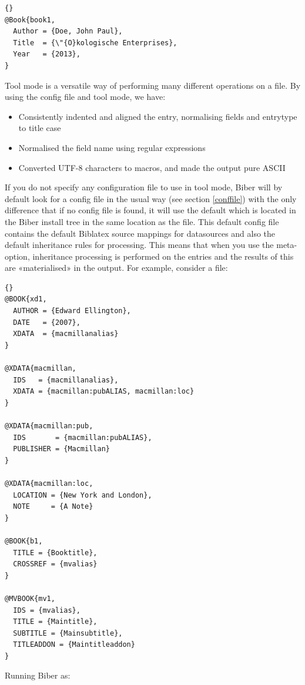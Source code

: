 \documentclass{ltxdockit}
\newcommand*{\biber}{Biber\xspace}
\newcommand*{\biblatex}{Biblatex\xspace}
\begin{document}
\begin{lstlisting}[style=bibtex, columns=fixed]{}
@Book{book1,
  Author = {Doe, John Paul},
  Title  = {\"{O}kologische Enterprises},
  Year   = {2013},
}
\end{lstlisting}
%
Tool mode is a versatile way of performing many different operations
on a  file. By using the config file and tool mode, we
have:

\begin{itemize}
\item Consistently indented and aligned the entry, normalising fields and
  entrytype to title case
\item Normalised the  field name using regular expressions
\item Converted UTF-8 characters to \latex macros, and made the output
  pure ASCII
\end{itemize}

If you do not specify any configuration file to use in tool mode, \biber
will by default look for a config file in the usual way (see section
\ref{conffile}) with the only difference that if no config file is found,
it will use the default  which is located in the
\biber install tree in the same location as the  file. This
default config file contains the default \biblatex source mappings for
\bibtex datasources and also the default inheritance rules for
 processing. This means that when you use the
 meta-option, inheritance processing is performed on the
entries and the results of this are «materialised» in the output. For
example, consider a  file:

\begin{lstlisting}[style=bibtex, columns=fixed]{}
@BOOK{xd1,
  AUTHOR = {Edward Ellington},
  DATE   = {2007},
  XDATA  = {macmillanalias}
}

@XDATA{macmillan,
  IDS   = {macmillanalias},
  XDATA = {macmillan:pubALIAS, macmillan:loc}
}

@XDATA{macmillan:pub,
  IDS       = {macmillan:pubALIAS},
  PUBLISHER = {Macmillan}
}

@XDATA{macmillan:loc,
  LOCATION = {New York and London},
  NOTE     = {A Note} 
}

@BOOK{b1,
  TITLE = {Booktitle},
  CROSSREF = {mvalias}
}

@MVBOOK{mv1,
  IDS = {mvalias},
  TITLE = {Maintitle},
  SUBTITLE = {Mainsubtitle},
  TITLEADDON = {Maintitleaddon}
}
\end{lstlisting}
%
Running \biber as:
\end{document}
